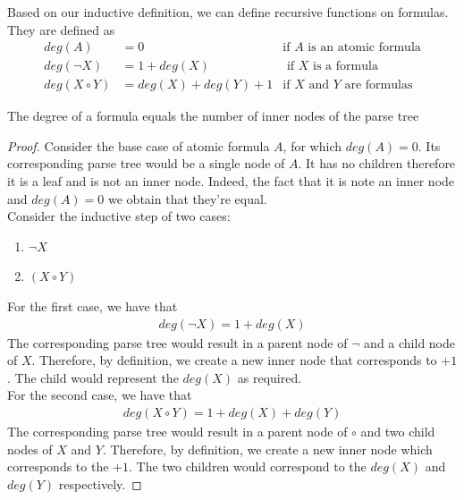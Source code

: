 \documentclass[a4paper]{article}
\theoremstyle{plain}
\newtheorem{thm}{Theorem}[section]
\theoremstyle{definition}
\newtheorem{defn}{Definition}[section]
\theoremstyle{remark}
\begin{document}
\begin{tcolorbox}[colback=black!3!white,colframe=black!60!white,title=\begin{defn}Recursion and Degrees \label{Recursion and Degrees}\end{defn}]
Based on our inductive definition, we can define recursive functions on formulas. They are defined as
\begin{align}
	deg(A) &= 0 & \text{if $A$ is an atomic formula} \\
	deg(\neg X) &= 1 + deg(X) & \text{ if $X$ is a formula} \\
	deg(X \circ Y) &= deg(X) + deg(Y) + 1 & \text{if $X$ and $Y$ are formulas}
\end{align}
\end{tcolorbox}
\begin{tcolorbox}[colback=black!3!white,colframe=black!60!white,title=\begin{thm}Degree and Inner Nodes \label{Degree and Inner Nodes}\end{thm}]
	The degree of a formula equals the number of inner nodes of the parse tree
	\begin{proof}
		Consider the base case of atomic formula $A$, for which $deg(A) = 0$. Its corresponding parse tree would be a single node of $A$. It has no children therefore it is a leaf and is not an inner node. Indeed, the fact that it is note an inner node and $deg(A) = 0$ we obtain that they're equal. \\
	Consider the inductive step of two cases:
	\begin{enumerate}
		\item $\neg X$ 
		\item $(X \circ Y)$
	\end{enumerate}
		For the first case, we have that
		\begin{align}
			deg(\neg X) = 1 + deg(X)
		\end{align}
		The corresponding parse tree would result in a parent node of $\neg$ and a child node of $X$. Therefore, by definition, we create a new inner node that corresponds to $+1$. The child would represent the $deg(X)$ as required. \\
		For the second case, we have that
		\begin{align}
			deg(X \circ Y) = 1 + deg(X) + deg(Y)
		\end{align}
		The corresponding parse tree would result in a parent node of $\circ$ and two child nodes of $X$ and $Y$. Therefore, by definition, we create a new inner node which corresponds to the $+1$. The two children would correspond to the $deg(X)$ and $deg(Y)$ respectively.
	\end{proof}
\end{tcolorbox}
\end{document}
